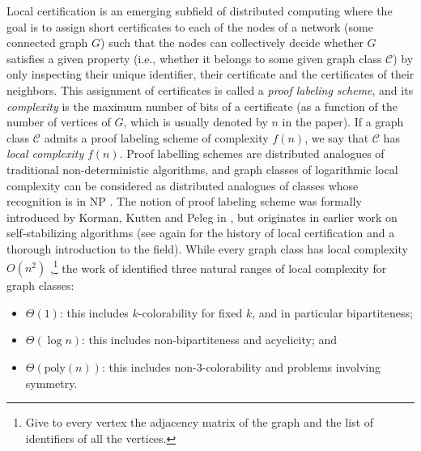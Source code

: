 \documentclass[a4paper,reqno, 12pt]{amsart}
\begin{document}
Local certification is an emerging subfield of distributed computing
where the goal is to assign short certificates to each of  the nodes of a
network (some connected graph $G$) such that the nodes can
collectively decide whether $G$ satisfies a given property (i.e., whether it
belongs to some given graph class $\mathcal{C}$) by only inspecting their unique identifier, 
their certificate and the certificates of their neighbors. This assignment of certificates is called a
\emph{proof labeling scheme}, and its \emph{complexity} is the
maximum number of bits of a certificate (as a function of the number of vertices
of $G$, which is usually denoted by $n$ in the paper). If a graph
class $\mathcal{C}$ admits a proof labeling scheme of complexity
$f(n)$, we say that $\mathcal{C}$ has \emph{local complexity}
$f(n)$. Proof labelling schemes are distributed analogues of
traditional non-deterministic algorithms, and graph classes of logarithmic local complexity can be considered as distributed analogues of
classes whose recognition is in \textsf{NP} \cite{Feu21}. The notion
of proof labeling scheme was formally introduced by Korman, Kutten
and Peleg in \cite{KKP10}, but originates in earlier work on
self-stabilizing algorithms (see again \cite{Feu21} for the history of
local certification and a thorough introduction to the field). While
every graph class has local complexity $O(n^2)$
\cite{KKP10},\footnote{Give to every vertex the adjacency matrix of
  the graph and the list of identifiers of all the vertices.} the work of \cite{lcp} identified three natural ranges of
local complexity for graph classes:

\begin{itemize}
\item $\Theta(1)$: this includes $k$-colorability for fixed $k$, and in
  particular bipartiteness;
\item $\Theta(\log n)$: this includes non-bipartiteness and
  acyclicity; and
  \item $\Theta(\text{poly}(n))$: this includes non-3-colorability
    and problems involving
    symmetry.
  \end{itemize}
\end{document}
